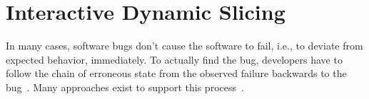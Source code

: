 \chapter{Interactive Dynamic Slicing}

\tmpStart
In many cases, software bugs don't cause the software to fail, i.e., to deviate from expected behavior, immediately.
To actually find the bug, developers have to follow the chain of erroneous state from the observed failure backwards to the bug~\cite{zeller_09_why_programs_fail}.
Many approaches exist to support this process~\cite{wong_16_a_survey_on_software}.
\tmpEnd


\tmpStart
%
%
%
